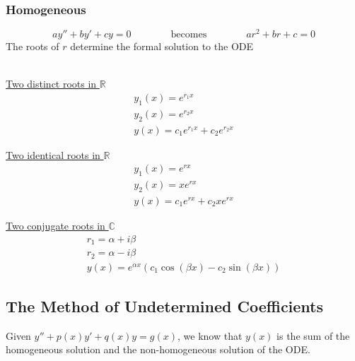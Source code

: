 \documentclass{article}
\begin{document}
\subsubsection*{Homogeneous}
\[
ay'' + by' + cy = 0\qquad\qquad\text{becomes}\qquad\qquad ar^{2} + br + c = 0
\]
\indent The roots of $r$ determine the formal solution to the ODE\\\\
\begin{minipage}[t]{0.3\textwidth}
\underline{Two distinct roots in $\mathbb{R}$}
\begin{gather*}
y_{1}(x) = e^{r_{1}x}\\
y_{2}(x) = e^{r_{2}x}\\
y(x) = c_{1}e^{r_{1}x} + c_{2}e^{r_{2}x}
\end{gather*}
\end{minipage}
\begin{minipage}[t]{0.3\textwidth}
\underline{Two identical roots in $\mathbb{R}$}
\begin{gather*}
y_{1}(x) = e^{rx}\\
y_{2}(x) = xe^{rx}\\ 
y(x) = c_{1}e^{rx} + c_{2}xe^{rx}
\end{gather*}
\end{minipage}
\begin{minipage}[t]{0.3\textwidth}
\underline{Two conjugate roots in $\mathbb{C}$}
\begin{gather*}
r_{1} = \alpha + i\beta\\
r_{2} = \alpha - i\beta\\
y(x) = e^{\alpha x}(c_{1}\cos{(\beta x)} - c_{2}\sin{(\beta x)})
\end{gather*}
\end{minipage}
\subsection{The Method of Undetermined Coefficients}
Given $y'' + p(x)y' + q(x)y = g(x)$, we know that $y(x)$ is the sum of the homogeneous solution and the non-homogeneous solution of the ODE.
\end{document}
